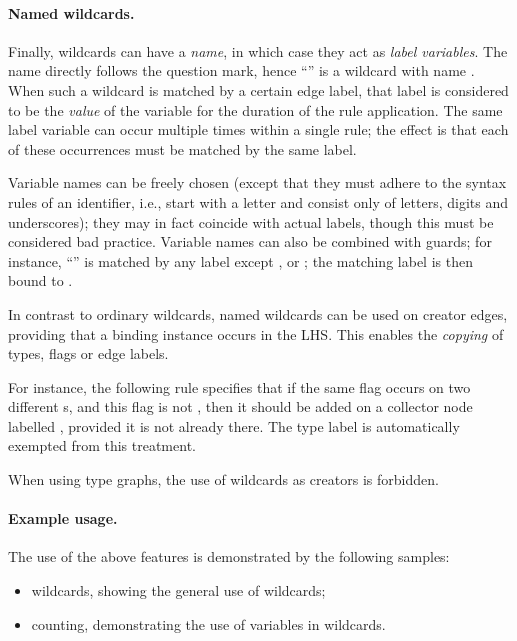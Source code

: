 \paragraph{Named wildcards.}

Finally, wildcards can have a \emph{name}, in which case they act as
\emph{label variables}. The name directly follows the question mark, hence
``'' is a wildcard with name . When such a wildcard is
matched by a certain edge label, that label is considered to be the
\emph{value} of the variable for the duration of the rule application. The same
label variable can occur multiple times within a single rule; the effect is
that each of these occurrences must be matched by the same label.

Variable names can be freely chosen (except that they must adhere to the syntax
rules of an identifier, i.e., start with a letter and consist only of letters,
digits and underscores); they may in fact coincide with actual labels, though
this must be considered bad practice. Variable names can also be combined with
guards; for instance, ``'' is matched by any label except
,  or ; the matching label is then bound to
.

In contrast to ordinary wildcards, named wildcards can be used on creator
edges, providing that a binding instance occurs in the LHS. This enables the
\emph{copying} of types, flags or edge labels.

For instance, the following rule specifies that if the same flag occurs on two
different s, and this flag is not , then it should be
added on a collector node labelled , provided it is not
already there. The type label  is automatically exempted from this
treatment.

%
When using type graphs, the use of wildcards as creators is forbidden.

\paragraph{Example usage.}

The use of the above features is demonstrated by the following \Groove samples:
%
\begin{itemize}\noitemsep
\item \textsf{wildcards}, showing the general use of wildcards;
\item \textsf{counting}, demonstrating the use of variables in wildcards.
\end{itemize}

